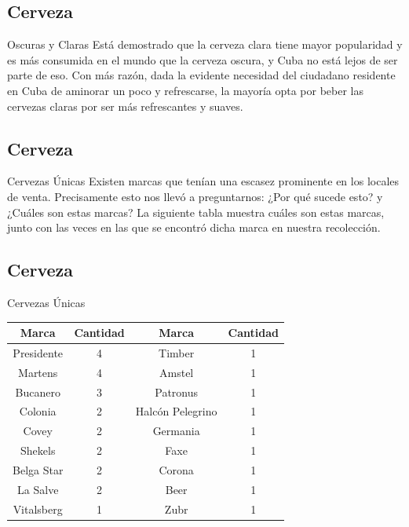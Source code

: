 \subsection{Cerveza}
\begin{frame}[fragile]{Oscuras y Claras}
  Está demostrado que la cerveza clara tiene mayor popularidad y es más consumida en el mundo que la cerveza oscura, y Cuba no está lejos de ser parte de eso. 
  Con más razón, dada la evidente necesidad del ciudadano residente en Cuba de aminorar un poco y refrescarse, la mayoría opta por beber las cervezas claras por ser más refrescantes y suaves.
  
\end{frame}

\subsection{Cerveza}
\begin{frame}[fragile]{Cervezas Únicas}
  Existen marcas que tenían una escasez prominente en los locales de venta. 
  Precisamente esto nos llevó a preguntarnos: ¿Por qué sucede esto? y ¿Cuáles son estas marcas?
  La siguiente tabla muestra cuáles son estas marcas, junto con las veces en las que se encontró dicha marca en nuestra recolección.
\end{frame}

\subsection{Cerveza}
\begin{frame}[fragile]{Cervezas Únicas}
  \begin{center}
    \begin{tabular}{|c|c|c|c|}
    \hline
    Marca & Cantidad & Marca & Cantidad\\
    \hline
    Presidente & 4 & Timber & 1\\
    \hline
    Martens & 4 & Amstel & 1\\
    \hline
    Bucanero & 3 & Patronus & 1\\
    \hline
    Colonia & 2& Halcón Pelegrino & 1\\
    \hline
    Covey & 2&Germania & 1\\
    \hline
    Shekels & 2&Faxe & 1\\
    \hline
    Belga Star & 2&Corona & 1\\
    \hline
    La Salve & 2&Beer & 1\\
    \hline
    Vitalsberg & 1&Zubr & 1\\
    \hline
    \end{tabular}
\end{center}
\end{frame}

